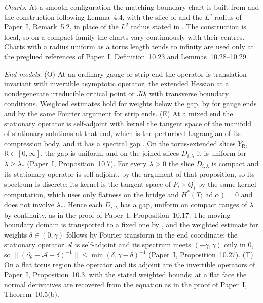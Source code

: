 \documentclass[11pt]{amsart}
\theoremstyle{definition}
\theoremstyle{remark}
\theoremstyle{plain}
\numberwithin{equation}{section}
\newcommand{\ad}{\operatorname{ad}}
\begin{document}
\emph{Charts.} At a smooth configuration the matching-boundary chart is
built from \cite[Lemmas~4.1, 4.2 and~4.4]{DFL} and the construction
following Lemma~4.4, with the slice of \cite[Proposition~4.6]{DFL} and
the $L^q$ radius of Paper~I, Remark~5.2, in place of the $L^2$ radius
stated in \cite[Lemma~4.1]{DFL}. The construction is local, so
on a compact family the charts vary continuously with their centres.
Charts with a radius uniform as a torus length tends to infinity are
used only at the preglued references of Paper~I, Definition~10.23 and
Lemmas~10.28--10.29.

\emph{End models.} (O) At an ordinary gauge or strip end the operator is
translation invariant with invertible asymptotic operator, the extended
Hessian at a nondegenerate irreducible critical point or $J\partial_t$
with transverse boundary conditions. Weighted estimates hold for weights
below the gap, by \cite[Section~3.3.1]{Donaldson-book} for gauge ends
and by the same Fourier argument for strip ends. (E) At a mixed end the
stationary operator is self-adjoint with kernel the tangent space of the
manifold of stationary solutions at that end, which is the perturbed
Lagrangian of its compression body, and it has a spectral gap
\cite[Section~4.2.1 and Proposition~4.21]{DFL}. On the torus-extended
slices $Y_{\mathsf R}$, $\mathsf R\in[0,\infty]$, the gap is uniform, and on
the joined slices $D_{i,\lambda}$ it is uniform for $\lambda\ge\lambda_*$
(Paper~I, Proposition~10.7). For every $\lambda>0$ the slice
$D_{i,\lambda}$ is compact and its stationary operator is self-adjoint, by
the argument of that proposition, so its spectrum is discrete; its kernel
is the tangent space of $P_i\times Q_i$ by the same kernel computation,
which uses only flatness on the bridge and $H^*(T;\ad\alpha)=0$ and does
not involve $\lambda_*$. Hence each $D_{i,\lambda}$ has a gap, uniform on
compact ranges of $\lambda$ by continuity, as in the proof of Paper~I,
Proposition~10.17. The moving boundary domain is transported to a fixed
one by \cite[Proposition~5.27 and Lemma~5.67]{DFL-mixed}, and the weighted
estimate for weights $\delta\in(0,\gamma)$ follows by Fourier transform in
the end coordinate: the stationary operator $\mathcal A$ is self-adjoint
and its spectrum meets $(-\gamma,\gamma)$ only in $0$, so
$\|(\partial_\theta+\mathcal A-\delta)^{-1}\|\le\min(\delta,\gamma-\delta)^{-1}$
(Paper~I, Proposition~10.27). (T) On a flat torus region the operator and its
adjoint are the invertible operators of Paper~I, Proposition~10.3, with
the stated weighted bounds; at a flat face the normal derivatives are
recovered from the equation as in the proof of Paper~I, Theorem~10.5(b).
\end{document}
